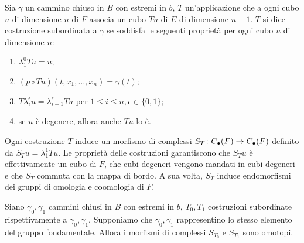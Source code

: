 \begin{definition}
Sia $\gamma$ un cammino chiuso in $B$ con estremi in $b$, $T$ un'applicazione che a ogni cubo $u$ di dimensione $n$ di $F$ associa un cubo $Tu$ di $E$ di dimensione $n+1$. $T$ si dice costruzione subordinata a $\gamma$ se soddisfa le seguenti proprietà per ogni cubo $u$ di dimensione $n$:
\begin{enumerate}
\item $\lambda^0_1 Tu=u$;
\item $(p\circ Tu)(t,x_1,\ldots,x_n)=\gamma(t)$;
\item $T\lambda^\epsilon_iu=\lambda^\epsilon_{i+1}Tu$ per $1\le i\le n,\epsilon\in\{0,1\}$;
\item se $u$ è degenere, allora anche $Tu$ lo è.
\end{enumerate}
\end{definition}
Ogni costruzione $T$ induce un morfismo di complessi $S_T\colon C_\bullet(F)\to C_\bullet(F)$ definito da $S_Tu=\lambda^1_1Tu$. Le proprietà delle costruzioni garantiscono che $S_Tu$ è effettivamente un cubo di $F$, che cubi degeneri vengono mandati in cubi degeneri e che $S_T$ commuta con la mappa di bordo. A sua volta, $S_T$ induce endomorfismi dei gruppi di omologia e coomologia di $F$.
\begin{proposition}
Siano $\gamma_0,\gamma_1$ cammini chiusi in $B$ con estremi in $b$, $T_0,T_1$ costruzioni subordinate rispettivamente a $\gamma_0,\gamma_1$. Supponiamo che $\gamma_0,\gamma_1$ rappresentino lo stesso elemento del gruppo fondamentale. Allora i morfismi di complessi $S_{T_0}$ e $S_{T_1}$ sono omotopi.
\end{proposition}
